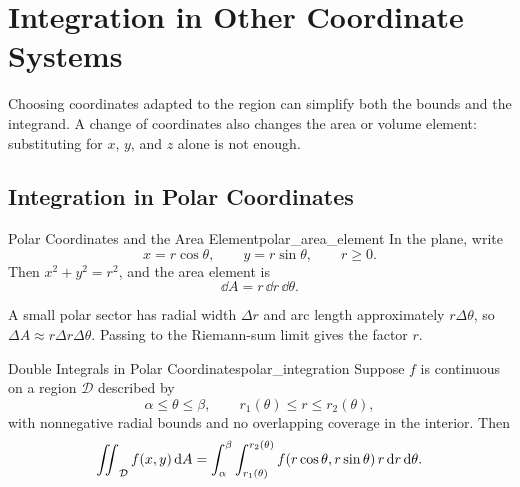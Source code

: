 \section{Integration in Other Coordinate Systems}

Choosing coordinates adapted to the region can simplify both the bounds and the integrand. A change of coordinates also changes the area or volume element: substituting for $x$, $y$, and $z$ alone is not enough.

\subsection{Integration in Polar Coordinates}

\begin{definition}{Polar Coordinates and the Area Element}{polar_area_element}
In the plane, write
\[
    x = r\cos\theta,\qquad y = r\sin\theta,\qquad r \geq 0.
\]
Then $x^2 + y^2 = r^2$, and the area element is
\[
    \boxed{\dd{A} = r\,\dd{r}\,\dd{\theta}}.
\]
\end{definition}

A small polar sector has radial width $\Delta r$ and arc length approximately $r\Delta\theta$, so $\Delta A \approx r\Delta r\Delta\theta$. Passing to the Riemann-sum limit gives the factor $r$.

\begin{center}
\end{center}

\begin{theorem}{Double Integrals in Polar Coordinates}{polar_integration}
Suppose $f$ is continuous on a region $\mathcal{D}$ described by
\[
    \alpha \leq \theta \leq \beta,\qquad
    r_1(\theta) \leq r \leq r_2(\theta),
\]
with nonnegative radial bounds and no overlapping coverage in the interior. Then
\[
    \mathop{\int\mkern-10mu\int}\nolimits_{\mathcal{D}} f(x,y) \, \mathrm{d}A
    = \int_\alpha^\beta\int_{r_1(\theta)}^{r_2(\theta)}
    f(r\cos\theta,r\sin\theta)\,r\,\mathrm{d}r\,\mathrm{d}\theta.
\]
\end{theorem}

